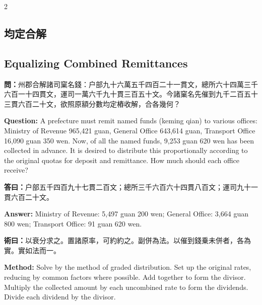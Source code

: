 \documentclass[11pt,a4paper]{article}
\newcommand{\QuestionText}[1]{\par\noindent\textbf{\color{problemcolor}問：}#1\par}
\newcommand{\AnswerText}[1]{\par\noindent\textbf{\color{answercolor}答曰：}#1\par}
\newcommand{\MethodText}[1]{\par\noindent\textbf{\color{methodcolor}術曰：}#1\par}
\newcommand{\QuestionEn}[1]{\par\noindent\textbf{\color{problemcolor}Question:} #1\par}
\newcommand{\AnswerEn}[1]{\par\noindent\textbf{\color{answercolor}Answer:} #1\par}
\newcommand{\MethodEn}[1]{\par\noindent\textbf{\color{methodcolor}Method:} #1\par}
\begin{document}
\begin{paracol}{2}

\subsection*{\color{sectioncolor}均定合解}
\switchcolumn
\subsection*{\color{sectioncolor}Equalizing Combined Remittances}
\switchcolumn*

\QuestionText{州郡合解諸司窠名錢：户部九十六萬五千四百二十一貫文，總所六十四萬三千六百一十四貫文，運司一萬六千九十貫三百五十文。今諸窠名先催到九千二百五十三貫六百二十文，欲照原額分數均定樁收解，合各幾何？}
\switchcolumn
\QuestionEn{A prefecture must remit named funds (keming qian) to various offices: Ministry of Revenue 965,421 guan, General Office 643,614 guan, Transport Office 16,090 guan 350 wen. Now, of all the named funds, 9,253 guan 620 wen has been collected in advance. It is desired to distribute this proportionally according to the original quotas for deposit and remittance. How much should each office receive?}
\switchcolumn*

\AnswerText{户部五千四百九十七貫二百文；總所三千六百六十四貫八百文；運司九十一貫六百二十文。}
\switchcolumn
\AnswerEn{Ministry of Revenue: 5,497 guan 200 wen; General Office: 3,664 guan 800 wen; Transport Office: 91 guan 620 wen.}
\switchcolumn*

\MethodText{以衰分求之。置諸原率，可約約之。副併為法。以催到錢乗未併者，各為實。實如法而一。}
\switchcolumn
\MethodEn{Solve by the method of graded distribution. Set up the original rates, reducing by common factors where possible. Add together to form the divisor. Multiply the collected amount by each uncombined rate to form the dividends. Divide each dividend by the divisor.}
\switchcolumn*


\end{paracol}
\end{document}

